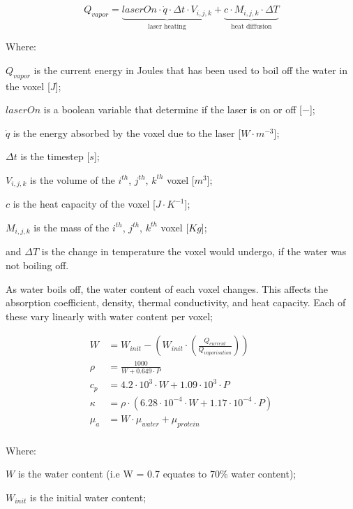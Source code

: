 \begin{equation}
Q_{vapor}=\underbrace{laserOn\cdot\dot{q}\cdot \Delta t\cdot V_{i,j,k}}_\text{laser heating} + \underbrace{c\cdot M_{i,j,k}\cdot\Delta T}_\text{heat diffusion}
\end{equation}

\noindent Where:

	\indent $Q_{vapor}$ is the current energy in Joules that has been used to boil off the water in the voxel [$J$];
	
	\indent $laserOn$ is a boolean variable that determine if the laser is on or off [$-$];
	
	\indent $\dot{q}$ is the energy absorbed by the voxel due to the laser [$W\cdot m^{-3}$];
	
	\indent $\Delta t$ is the timestep [$s$];
	
	\indent $V_{i,j,k}$ is the volume of the $i^{th}$, $j^{th}$, $k^{th}$ voxel [$m^3$];
	
	\indent $c$ is the heat capacity of the voxel [$J\cdot K^{-1}$];
	
	\indent $M_{i,j,k}$ is the mass of the $i^{th}$, $j^{th}$, $k^{th}$ voxel [$Kg$];
	
	\indent and $\Delta T$ is the change in temperature the voxel would undergo, if the water was not boiling off.

	\medskip
	
As water boils off, the water content of each voxel changes. This affects the absorption coefficient, density, thermal conductivity, and heat capacity. Each of these vary linearly with water content per voxel\cite{choi2001analysis};

\begin{align}
W &= W_{init} - \left(W_{init} \cdot \left(\tfrac{Q_{current}}{Q_{vaporisation}}\right)\right) \\
\rho &= \frac{1000}{W + 0.649\cdot P} \\
c_p &= 4.2\cdot 10^{3}\cdot W + 1.09\cdot 10^{3}\cdot P \\
\kappa &= \rho \cdot (6.28\cdot 10^{-4}\cdot W + 1.17\cdot 10^{-4} \cdot P)\\
\mu_a &= W \cdot \mu_{water} + \mu_{protein}\\
\end{align}

\noindent Where:

\indent $W$ is the water content (i.e W = 0.7 equates to 70\% water content);

\indent $W_{init}$ is the initial water content;

